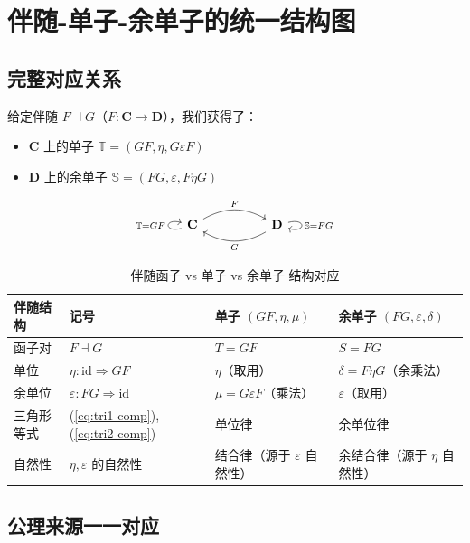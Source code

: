 \documentclass[12pt,a4paper]{ctexart}
\theoremstyle{definition}
\newcommand{\cat}[1]{\mathbf{#1}}
\newcommand{\id}{\mathrm{id}}
\newcommand{\dashvadj}{\dashv}
\begin{document}
\section{伴随-单子-余单子的统一结构图}

\subsection{完整对应关系}

给定伴随 $F \dashvadj G$（$F: \cat{C} \to \cat{D}$），我们获得了：
\begin{itemize}[nosep]
    \item $\cat{C}$ 上的单子 $\mathbb{T} = (GF, \eta, G\varepsilon F)$
    \item $\cat{D}$ 上的余单子 $\mathbb{S} = (FG, \varepsilon, F\eta G)$
\end{itemize}

\[
\begin{tikzcd}[column sep=5em, row sep=4em]
\cat{C} \arrow[r,bend left,"F"] \arrow[loop left,"\mathbb{T}=GF"] & \cat{D} \arrow[l,bend left,"G"] \arrow[loop right,"\mathbb{S}=FG"]
\end{tikzcd}
\]

\begin{table}[h]
\centering
\caption{伴随函子 vs 单子 vs 余单子 结构对应}
\begin{tabular}{@{}l|l|l|l@{}}
\toprule
\textbf{伴随结构} & \textbf{记号} & \textbf{单子 $(GF, \eta, \mu)$} & \textbf{余单子 $(FG, \varepsilon, \delta)$} \\
\midrule
函子对     & $F \dashvadj G$ & $T = GF$ & $S = FG$ \\
单位       & $\eta: \id \Rightarrow GF$ & $\eta$（取用）& $\delta = F\eta G$（余乘法）\\
余单位     & $\varepsilon: FG \Rightarrow \id$ & $\mu = G\varepsilon F$（乘法）& $\varepsilon$（取用）\\
三角形等式 & (\ref{eq:tri1-comp}), (\ref{eq:tri2-comp}) & 单位律 & 余单位律 \\
自然性     & $\eta,\varepsilon$ 的自然性 & 结合律（源于 $\varepsilon$ 自然性） & 余结合律（源于 $\eta$ 自然性） \\
\bottomrule
\end{tabular}
\end{table}

\subsection{公理来源一一对应}
\end{document}

